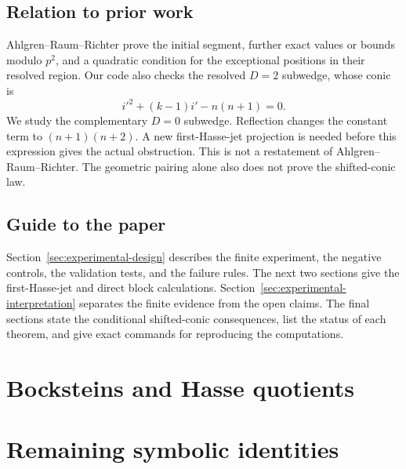 \documentclass[11pt]{article}
\theoremstyle{remark}
\begin{document}
\subsection{Relation to prior work}

Ahlgren--Raum--Richter \cite{ARR2026} prove the initial segment, further
exact values or bounds modulo $p^2$, and a quadratic condition for the
exceptional positions in their resolved region.  Our code also checks the
resolved $D=2$ subwedge, whose conic is
\[
 i'^2+(k-1)i'-n(n+1)=0.
\]
We study the complementary $D=0$ subwedge.  Reflection changes the constant
term to $(n+1)(n+2)$.  A new first-Hasse-jet projection is needed before this
expression gives the actual obstruction.  This is not a restatement of
Ahlgren--Raum--Richter.  The geometric pairing alone also does not prove the
shifted-conic law.

\subsection{Guide to the paper}

Section~\ref{sec:experimental-design} describes the finite experiment, the
negative controls, the validation tests, and the failure rules.  The next two
sections give the first-Hasse-jet and direct block calculations.
Section~\ref{sec:experimental-interpretation} separates the finite evidence
from the open claims.  The final sections state the conditional shifted-conic
consequences, list the status of each theorem, and give exact commands for
reproducing the computations.





\section{Bocksteins and Hasse quotients}











\section{Remaining symbolic identities}
\end{document}
